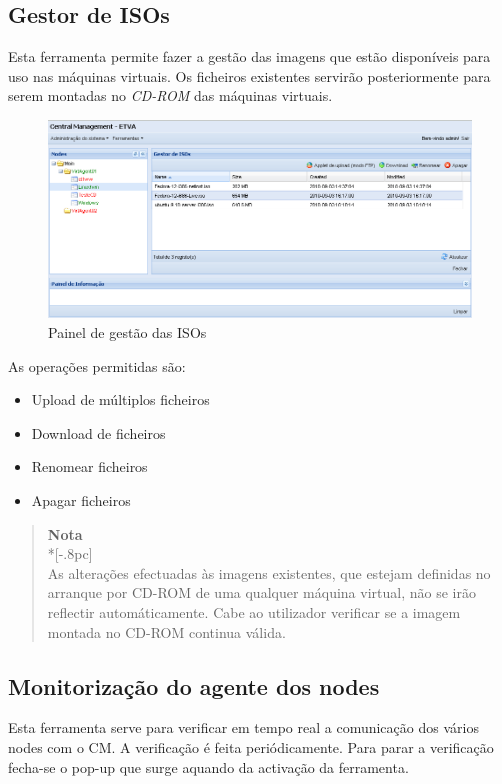 \subsection{Gestor de ISOs}
Esta ferramenta permite fazer a gestão das imagens que estão disponíveis para uso nas máquinas virtuais.
Os ficheiros existentes servirão posteriormente para serem montadas no \emph{CD-ROM} das máquinas virtuais.

\begin{figure}[H]
	\begin{center}
	\includegraphics[scale=0.5]{screenshots/iso_manager.png}
	\caption{Painel de gestão das ISOs}
	\label{fig:iso_manager}
	\end{center}
\end{figure}

As operações permitidas são:
\begin{itemize}
\item Upload de múltiplos ficheiros
\item Download de ficheiros
\item Renomear ficheiros
\item Apagar ficheiros
\end{itemize}


\begin{quote}
	{\large \bf Nota} \\*[-.8pc]
	\underline{\hspace{6in}} \\
	As alterações efectuadas às imagens existentes, que estejam definidas no arranque por CD-ROM de uma qualquer máquina virtual,
     não se irão reflectir automáticamente. Cabe ao utilizador verificar se a imagem montada no CD-ROM continua válida.
\end{quote}

\subsection{Monitorização do agente dos nodes}
Esta ferramenta serve para verificar em tempo real a comunicação dos vários nodes com o CM. A verificação é feita periódicamente.
Para parar a verificação fecha-se o pop-up que surge aquando da activação da ferramenta.

